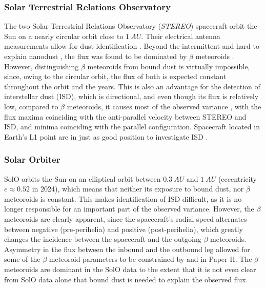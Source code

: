 \subsubsection{Solar Terrestrial Relations Observatory}

The two Solar Terrestrial Relations Observatory (\textit{STEREO}) spacecraft orbit the Sun on a nearly circular orbit close to $\SI{1}{AU}$. Their electrical antenna measurements allow for dust identification \citep{meyer2009dust}. Beyond the intermittent and hard to explain nanodust \citep{meyer2009dust}, the flux was found to be dominated by $\beta$ meteoroids \citep{zaslavsky2012interplanetary}. However, distinguishing $\beta$ meteoroids from bound dust is virtually impossible, since, owing to the circular orbit, the flux of both is expected constant throughout the orbit and the years. This is also an advantage for the detection of interstellar dust (ISD), which is directional, and even though its flux is relatively low, compared to $\beta$ meteoroids, it causes most of the observed variance \citep{zaslavsky2012interplanetary,malaspina2015revisiting,babic2022situ}, with the flux maxima coinciding with the anti-parallel velocity between STEREO and ISD, and minima coinciding with the parallel configuration. Spacecraft located in Earth's L1 point are in just as good position to investigate ISD \citep{malaspina2014interplanetary,malaspina2016database}.

\subsubsection{Solar Orbiter}

SolO orbits the Sun on an elliptical orbit between $\SI{0.3}{AU}$ and $\SI{1}{AU}$ (eccentricity $e \approx 0.52$ in 2024), which means that neither its exposure to bound dust, nor $\beta$ meteoroids is constant. This makes identification of ISD difficult, as it is no longer responsible for an important part of the observed variance. However, the $\beta$ meteoroids are clearly apparent, since the spacecraft's radial speed alternates between negative (pre-perihelia) and positive (post-perihelia), which greatly changes the incidence between the spacecraft and the outgoing $\beta$ meteoroids. Asymmetry in the flux between the inbound and the outbound leg allowed for some of the $\beta$ meteoroid parameters to be constrained by \citet{zaslavsky2021first} and in Paper II. The $\beta$ meteoroids are dominant in the SolO data to the extent that it is not even clear from SolO data alone that bound dust is needed to explain the observed flux.


